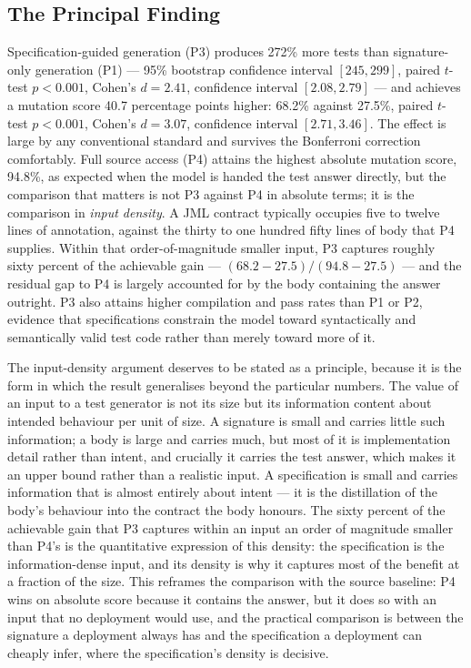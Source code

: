 \subsection{The Principal Finding}

Specification-guided generation (P3) produces 272\% more tests than
signature-only generation (P1) --- 95\% bootstrap confidence interval
$[245, 299]$, paired $t$-test $p < 0.001$, Cohen's $d = 2.41$, confidence
interval $[2.08, 2.79]$ --- and achieves a mutation score 40.7 percentage
points higher: 68.2\% against 27.5\%, paired $t$-test $p < 0.001$, Cohen's
$d = 3.07$, confidence interval $[2.71, 3.46]$. The effect is large by any
conventional standard and survives the Bonferroni correction comfortably. Full
source access (P4) attains the highest absolute mutation score, 94.8\%, as
expected when the model is handed the test answer directly, but the comparison
that matters is not P3 against P4 in absolute terms; it is the comparison in
\emph{input density}. A JML contract typically occupies five to twelve lines of
annotation, against the thirty to one hundred fifty lines of body that P4
supplies. Within that order-of-magnitude smaller input, P3 captures roughly
sixty percent of the achievable gain --- $(68.2 - 27.5)/(94.8 - 27.5)$ --- and
the residual gap to P4 is largely accounted for by the body containing the
answer outright. P3 also attains higher compilation and pass rates than P1 or
P2, evidence that specifications constrain the model toward syntactically and
semantically valid test code rather than merely toward more of it.

The input-density argument deserves to be stated as a principle, because it is the
form in which the result generalises beyond the particular numbers. The value of an
input to a test generator is not its size but its information content about
intended behaviour per unit of size. A signature is small and carries little such
information; a body is large and carries much, but most of it is implementation
detail rather than intent, and crucially it carries the test answer, which makes it
an upper bound rather than a realistic input. A specification is small and carries
information that is almost entirely about intent --- it is the distillation of the
body's behaviour into the contract the body honours. The sixty percent of the
achievable gain that P3 captures within an input an order of magnitude smaller than
P4's is the quantitative expression of this density: the specification is the
information-dense input, and its density is why it captures most of the benefit at
a fraction of the size. This reframes the comparison with the source baseline: P4
wins on absolute score because it contains the answer, but it does so with an input
that no deployment would use, and the practical comparison is between the signature
a deployment always has and the specification a deployment can cheaply infer, where
the specification's density is decisive.


